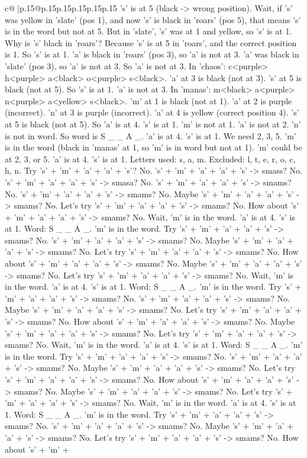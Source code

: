 \documentclass{article}
\begin{document}
{\begin{supertabular}{c@{$\;$}|p{.15\linewidth}@{}p{.15\linewidth}p{.15\linewidth}p{.15\linewidth}p{.15\linewidth}p{.15\linewidth}}
{{{'s' is at 5 (black {-}> wrong position). Wait, if 's' was yellow in 'slate' (pos 1), and now 's' is black in 'roars' (pos 5), that means 's' is in the word but not at 5. But in 'slate', 's' was at 1 and yellow, so 's' is at 1. Why is 's' black in 'roars'? Because 's' is at 5 in 'roars', and the correct position is 1. So 's' is at 1. 'a' is black in 'roars' (pos 3), so 'a' is not at 3. 'a' was black in 'slate' (pos 3), so 'a' is not at 3. So 'a' is not at 3. In 'chaos': c<purple> h<purple> a<black> o<purple> s<black>. 'a' at 3 is black (not at 3). 's' at 5 is black (not at 5). So 's' is at 1. 'a' is not at 3. In 'manas': m<black> a<purple> n<purple> a<yellow> s<black>. 'm' at 1 is black (not at 1). 'a' at 2 is purple (incorrect). 'n' at 3 is purple (incorrect). 'a' at 4 is yellow (correct position 4). 's' at 5 is black (not at 5). So 'a' is at 4. 's' is at 1. 'm' is not at 1. 'a' is not at 2. 'n' is not in word. So word is S \_ \_ A \_. 'a' is at 4. 's' is at 1. We need 2, 3, 5. 'm' is in the word (black in 'manas' at 1, so 'm' is in word but not at 1). 'm' could be at 2, 3, or 5. 'a' is at 4. 's' is at 1. Letters used: s, a, m. Excluded: l, t, e, r, o, c, h, n. Try 's' + 'm' + 'a' + 'a' + 's'? No. 's' + 'm' + 'a' + 'a' + 's' {-}> smass? No. 's' + 'm' + 'a' + 'a' + 's' {-}> smasa? No. 's' + 'm' + 'a' + 'a' + 's' {-}> smams? No. 's' + 'm' + 'a' + 'a' + 's' {-}> smams? No. Maybe 's' + 'm' + 'a' + 'a' + 's' {-}> smams? No. Let's try 's' + 'm' + 'a' + 'a' + 's' {-}> smams? No. How about 's' + 'm' + 'a' + 'a' + 's' {-}> smams? No. Wait, 'm' is in the word. 'a' is at 4. 's' is at 1. Word: S \_ \_ A \_. 'm' is in the word. Try 's' + 'm' + 'a' + 'a' + 's' {-}> smams? No. 's' + 'm' + 'a' + 'a' + 's' {-}> smams? No. Maybe 's' + 'm' + 'a' + 'a' + 's' {-}> smams? No. Let's try 's' + 'm' + 'a' + 'a' + 's' {-}> smams? No. How about 's' + 'm' + 'a' + 'a' + 's' {-}> smams? No. Maybe 's' + 'm' + 'a' + 'a' + 's' {-}> smams? No. Let's try 's' + 'm' + 'a' + 'a' + 's' {-}> smams? No. Wait, 'm' is in the word. 'a' is at 4. 's' is at 1. Word: S \_ \_ A \_. 'm' is in the word. Try 's' + 'm' + 'a' + 'a' + 's' {-}> smams? No. 's' + 'm' + 'a' + 'a' + 's' {-}> smams? No. Maybe 's' + 'm' + 'a' + 'a' + 's' {-}> smams? No. Let's try 's' + 'm' + 'a' + 'a' + 's' {-}> smams? No. How about 's' + 'm' + 'a' + 'a' + 's' {-}> smams? No. Maybe 's' + 'm' + 'a' + 'a' + 's' {-}> smams? No. Let's try 's' + 'm' + 'a' + 'a' + 's' {-}> smams? No. Wait, 'm' is in the word. 'a' is at 4. 's' is at 1. Word: S \_ \_ A \_. 'm' is in the word. Try 's' + 'm' + 'a' + 'a' + 's' {-}> smams? No. 's' + 'm' + 'a' + 'a' + 's' {-}> smams? No. Maybe 's' + 'm' + 'a' + 'a' + 's' {-}> smams? No. Let's try 's' + 'm' + 'a' + 'a' + 's' {-}> smams? No. How about 's' + 'm' + 'a' + 'a' + 's' {-}> smams? No. Maybe 's' + 'm' + 'a' + 'a' + 's' {-}> smams? No. Let's try 's' + 'm' + 'a' + 'a' + 's' {-}> smams? No. Wait, 'm' is in the word. 'a' is at 4. 's' is at 1. Word: S \_ \_ A \_. 'm' is in the word. Try 's' + 'm' + 'a' + 'a' + 's' {-}> smams? No. 's' + 'm' + 'a' + 'a' + 's' {-}> smams? No. Maybe 's' + 'm' + 'a' + 'a' + 's' {-}> smams? No. Let's try 's' + 'm' + 'a' + 'a' + 's' {-}> smams? No. How about 's' + 'm' + }}}
\end{supertabular}}
\end{document}
